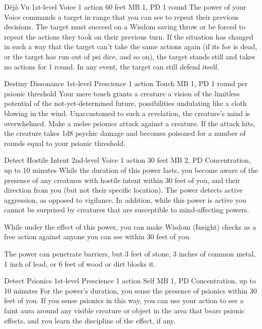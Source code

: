 \DndPowerHeader%
  {Déjà Vu}
  {1st-level Voice}
  {1 action}
  {60 feet}
  {MB 1, PD \lvlone}
  {1 round}
The power of your Voice commands a target in range
that you can see to repeat their previous decisions.
The target must succeed on a Wisdom saving throw
or be forced to repeat the actions they took on their previous turn.
If the situation has changed in such a way that the target
can't take the same actions again
(if its foe is dead, or the target has run out of psi dice, and so on),
the target stands still and takes no actions for 1 round.
In any event, the target can still defend itself.

\DndPowerHeader%
  {Destiny Dissonance}
  {1st-level Prescience}
  {1 action}
  {Touch}
  {MB 1, PD \lvlone}
  {1 round per psionic threshold}
Your mere touch grants a creature
a vision of the limitless potential
of the not-yet-determined future,
possibilities undulating like a cloth blowing in the wind.
Unaccustomed to such a revelation,
the creature's mind is overwhelmed.
Make a melee psionics attack against a creature.
If the attack hits,
the creature takes 1d8 psychic damage
and becomes poisoned for a number of rounds
equal to your psionic threshold.

\DndPowerHeader%
  {Detect Hostile Intent}
  {2nd-level Voice}
  {1 action}
  {30 feet}
  {MB 2, PD \lvltwo}
  {Concentration, up to 10 minutes}
While the duration of this power lasts,
you become aware of the presence of any creatures with hostile intent
within 30 feet of you,
and their direction from you
(but not their specific location).
The power detects active aggression,
as opposed to vigilance.
In addition, while this power is active you cannot be surprised
by creatures that are susceptible to mind-affecting powers.

While under the effect of this power,
you can make Wisdom (Insight) checks as a free action
against anyone you can see within 30 feet of you.

The power can penetrate barriers,
but 3 feet of stone,
3 inches of common metal,
1 inch of lead,
or 6 feet of wood or dirt blocks it.

\DndPowerHeader%
  {Detect Psionics}
  {1st-level Prescience}
  {1 action}
  {Self}
  {MB 1, PD \lvlone}
  {Concentration, up to 10 minutes}
For the power's duration,
you sense the presence of psionics within 30 feet of you.
If you sense psionics in this way,
you can use your action to see a faint aura around
any visible creature or object in the area that bears psionic effects,
and you learn the discipline of the effect, if any.

